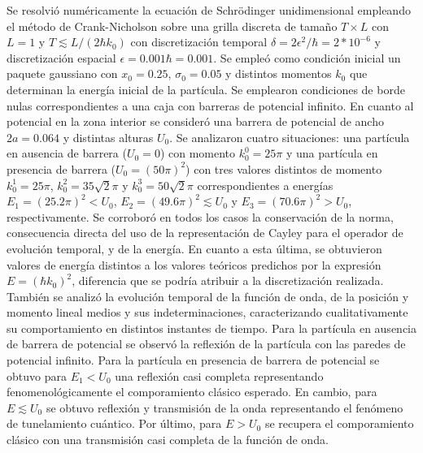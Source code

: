 \documentclass[aps,prb,twocolumn,superscriptaddress,floatfix,longbibliography]{revtex4-2}
\newcounter{para}
\begin{document}
Se resolvió numéricamente la ecuación de Schrödinger unidimensional empleando el método de Crank-Nicholson sobre una grilla discreta de tamaño $T \times L$ con $L = 1$ y $T \lesssim L/(2 \hbar k_0)$ con discretización temporal $\delta = 2 \epsilon^2 / \hbar = 2*10^{-6}$ y discretización espacial $\epsilon = 0.001 \hbar = 0.001$. Se empleó como condición inicial un paquete gaussiano con $x_0 = 0.25$, $\sigma_0 = 0.05$ y distintos momentos $k_0$ que determinan la energía inicial de la partícula. Se emplearon condiciones de borde nulas correspondientes a una caja con barreras de potencial infinito. En cuanto al potencial en la zona interior se consideró una barrera de potencial de ancho $2 a = 0.064$ y distintas alturas $U_0$. Se analizaron cuatro situaciones: una partícula en ausencia de barrera ($U_0 = 0$) con momento $k_0^0 = 25 \pi$ y una partícula en presencia de barrera ($U_0 = (50 \pi)^2$) con tres valores distintos de momento $k_0^1 = 25 \pi$, $k_0^2 = 35 \sqrt{2} \pi$ y $k_0^3 = 50 \sqrt{2} \pi$ correspondientes a energías $E_1 = (25.2 \pi)^2 < U_0$, $E_2 = (49.6 \pi)^2 \lesssim U_0$ y $E_3 = (70.6 \pi)^2  > U_0$, respectivamente. Se corroboró en todos los casos la conservación de la norma, consecuencia directa del uso de la representación de Cayley para el operador de evolución temporal, y de la energía. En cuanto a esta última, se obtuvieron valores de energía distintos a los valores teóricos predichos por la expresión $E = (\hbar k_0)^2$, diferencia que se podría atribuir a la discretización realizada. También se analizó la evolución temporal de la función de onda, de la posición y momento lineal medios y sus indeterminaciones, caracterizando cualitativamente su comportamiento en distintos instantes de tiempo. Para la partícula en ausencia de barrera de potencial se observó la reflexión de la partícula con las paredes de potencial infinito. Para la partícula en presencia de barrera de potencial se obtuvo para $E_1 < U_0$ una reflexión casi completa representando fenomenológicamente el comporamiento clásico esperado. En cambio, para $E \lesssim U_0$  se obtuvo reflexión y transmisión de la onda representando el fenómeno de tunelamiento cuántico. Por último, para $E > U_0$ se recupera el comporamiento clásico con una transmisión casi completa de la función de onda.


\end{document}
